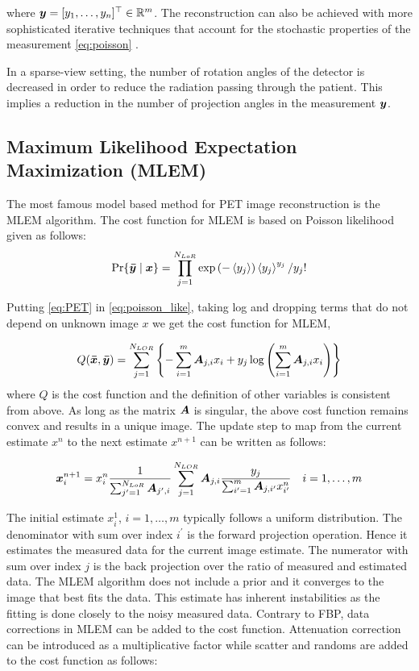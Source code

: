 where $\bm{y}  =  [y_1,\dots,y_n]^\top\in \mathbb{R}^m$. The reconstruction can also be achieved with more sophisticated iterative techniques that account for the stochastic properties of the measurement \eqref{eq:poisson} \cite{nuyts1998iterative,Elbakri2002}.

In a sparse-view setting, the number of rotation angles of the detector is decreased in order to reduce the radiation passing through the patient. This implies a reduction in the number of projection angles in the measurement $\bm{y}$.

\subsection{Maximum Likelihood Expectation Maximization (MLEM)}
The most famous model based method for \ac{PET} image reconstruction is the \ac{MLEM} algorithm. The cost function for \ac{MLEM} is based on Poisson likelihood given as follows:
\begin{equation}\label{eq:poisson_like}
\operatorname{Pr}\{\bm{\bar{y}} \mid \bm{x}\}=\prod_{j=1}^{N_{L o R}} \exp \left(-\left\langle y_{j}\right\rangle\right)\left\langle y_{j}\right\rangle^{y_{j}} / y_{j} !
\end{equation}

Putting \ref{eq:PET} in \ref{eq:poisson_like}, taking log and dropping terms that do not depend on unknown image $x$ we get the cost function for \ac{MLEM},

\begin{equation}
Q(\bm{\bar{x}}, \bm{\bar{y}})=\sum_{j=1}^{N_{L O R}}\left\{-\sum_{i=1}^{m} \bm{A}_{j, i} x_{i}+y_{j} \log \left(\sum_{i=1}^{m} \bm{A}_{j, i} x_{i}\right)\right\}
\end{equation}
where $Q$ is the cost function and the definition of other variables is consistent from above. As long as the matrix $\bm{A}$ is singular, the above cost function remains convex and results in a unique image. 
The update step to map from the current estimate $x^{n}$ to the next estimate $x^{n+1}$ can be written as follows:

\begin{equation}\label{eq:mlem}
\bm{x}_{i}^{n+1}=x_{i}^{n} \frac{1}{\sum_{j^{\prime}=1}^{N_{L o R}} \bm{A}_{j^{\prime}, i}} \sum_{j=1}^{N_{L O R}} \bm{A}_{j, i} \frac{y_{j}}{\sum_{i^{\prime}=1}^{m} \bm{A}_{j, i^{\prime}} x_{i^{\prime}}^{n}} \quad i=1, \ldots, m
\end{equation}

The initial estimate $x_i^{1}$, $i=1, \ldots, m$ typically follows a uniform distribution. The denominator with sum over index $i^{\prime}$ is the forward projection operation. Hence it estimates the measured data for the current image estimate. The numerator with sum over index $j$ is the back projection over the ratio of measured and estimated data. The \ac{MLEM} algorithm does not include a prior and it converges to the image that best fits the data. This estimate has inherent instabilities as the fitting is done closely to the noisy measured data. Contrary to \ac{FBP}, data corrections in \ac{MLEM} can be added to the cost function. Attenuation correction can be introduced as a multiplicative factor while scatter and randoms are added to the cost function as follows:

